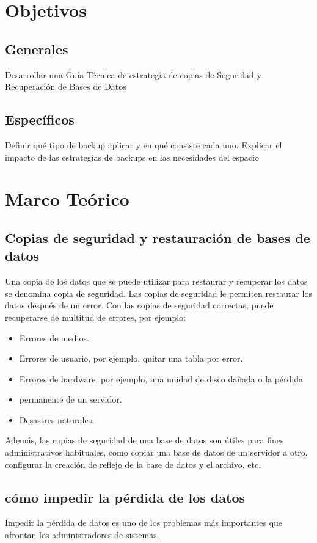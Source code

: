 \documentclass[a4paper,openright,12pt]{book}
\renewcommand\thesection{\arabic{section}}
\begin{document}
\section{Objetivos}\label{se:nudo}
\lhead[\thepage/\pageref{LastPage}]{\thesection. Nudo}
\rhead[\thesection. Nudo]{\thepage/\pageref{LastPage}}
\subsection{Generales}
Desarrollar una Guía Técnica de estrategia de copias de Seguridad y Recuperación de Bases de Datos
\subsection{Específicos}
Definir qué tipo de backup aplicar y en qué consiste cada uno.
Explicar el impacto de las estrategias de backups en las necesidades del espacio

\section{Marco Teórico}\label{se:nudo}
\subsection{Copias de seguridad y restauración de bases de datos}

Una copia de los datos que se puede utilizar para restaurar y recuperar los datos se denomina copia de seguridad. Las copias de seguridad le permiten restaurar los datos después de un error. Con las copias de seguridad correctas, puede recuperarse de multitud de errores, por ejemplo:
\begin{itemize}
\item Errores de medios.
\item Errores de usuario, por ejemplo, quitar una tabla por error.
\item Errores de hardware, por ejemplo, una unidad de disco dañada o la pérdida
\item permanente de un servidor.
\item Desastres naturales.
\end{itemize}
Además, las copias de seguridad de una base de datos son útiles para fines administrativos habituales, como copiar una base de datos de un servidor a otro, configurar la creación de reflejo de la base de datos y el archivo, etc.

\subsection{cómo impedir la pérdida de los datos}
Impedir la pérdida de datos es uno de los problemas más importantes que afrontan los administradores de sistemas.
\end{document}
